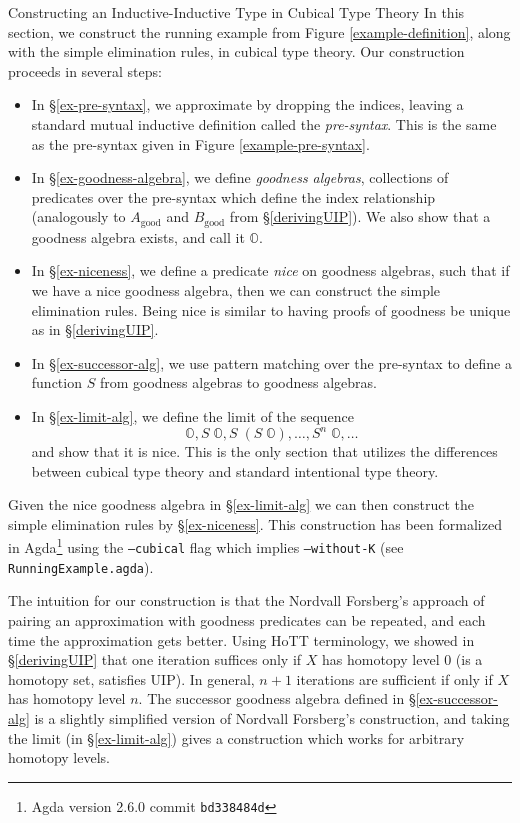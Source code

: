 \documentclass[runningheads]{llncs}
\newcommand{\good}[1]{{#1}_\text{good}}
\newcommand{\bbO}{\mathbb{O}}
\def\Forsberg/{Nordvall Forsberg}
\begin{document}
\begin{section}{Constructing an Inductive-Inductive Type in Cubical Type Theory}
In this section, we construct the running example from Figure \ref{example-definition}, along with the simple elimination rules, in cubical type theory. Our construction proceeds in several steps:
\begin{itemize}
    \item In \S\ref{ex-pre-syntax}, we approximate by dropping the indices, leaving a standard mutual inductive definition called the \emph{pre-syntax}. This is the same as the pre-syntax given in Figure \ref{example-pre-syntax}.
    \item In \S\ref{ex-goodness-algebra}, we define \emph{goodness algebras}, collections of predicates over the pre-syntax which define the index relationship (analogously to $\good{A}$ and $\good{B}$ from \S\ref{derivingUIP}). We also show that a goodness algebra exists, and call it $\bbO$.
    \item In \S\ref{ex-niceness}, we define a predicate \emph{nice} on goodness algebras, such that if we have a nice goodness algebra, then we can construct the simple elimination rules. Being nice is similar to having proofs of goodness be unique as in \S\ref{derivingUIP}.
    \item In \S\ref{ex-successor-alg}, we use pattern matching over the pre-syntax to define a function $S$ from goodness algebras to goodness algebras.
    \item In \S\ref{ex-limit-alg}, we define the limit of the sequence \[\bbO, S\;\bbO, S\;(S\;\bbO), \dots, S^n\;\bbO,\dots\] and show that it is nice. This is the only section that utilizes the differences between cubical type theory and standard intentional type theory.
\end{itemize}
Given the nice goodness algebra in \S\ref{ex-limit-alg} we can then construct the simple elimination rules by \S\ref{ex-niceness}. This construction has been formalized in Agda\footnote{Agda version 2.6.0 commit \texttt{bd338484d}} using the \texttt{--cubical} flag which implies \texttt{--without-K} (see \texttt{RunningExample.agda}).

The intuition for our construction is that the \Forsberg/'s approach of pairing an approximation with goodness predicates can be repeated, and each time the approximation gets better. Using HoTT terminology, we showed in \S\ref{derivingUIP} that one iteration suffices only if $X$ has homotopy level 0 (is a homotopy set, satisfies UIP). In general, $n+1$ iterations are sufficient if only if $X$ has homotopy level $n$. The successor goodness algebra defined in \S\ref{ex-successor-alg} is a slightly simplified version of \Forsberg/'s construction, and taking the limit (in \S\ref{ex-limit-alg}) gives a construction which works for arbitrary homotopy levels.


\end{section}
\end{document}
